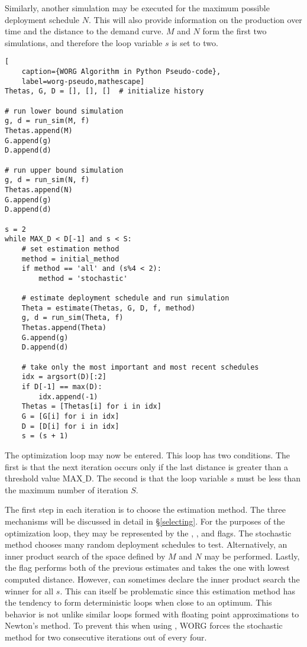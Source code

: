 Similarly, another simulation may be executed for the maximum possible
deployment schedule $N$. This will also provide information on the 
production over time and the distance to the demand curve. $M$ and $N$
form the first two simulations, and therefore the loop 
variable $s$ is set to two.

\clearpage
\begin{lstlisting}[
    caption={WORG Algorithm in Python Pseudo-code},
    label=worg-pseudo,mathescape]
Thetas, G, D = [], [], []  # initialize history

# run lower bound simulation
g, d = run_sim(M, f)
Thetas.append(M)
G.append(g)
D.append(d)

# run upper bound simulation    
g, d = run_sim(N, f)
Thetas.append(N)
G.append(g)
D.append(d)

s = 2
while MAX_D < D[-1] and s < S:
    # set estimation method
    method = initial_method
    if method == 'all' and (s%4 < 2):
        method = 'stochastic'

    # estimate deployment schedule and run simulation
    Theta = estimate(Thetas, G, D, f, method)
    g, d = run_sim(Theta, f)
    Thetas.append(Theta)
    G.append(g)
    D.append(d)

    # take only the most important and most recent schedules
    idx = argsort(D)[:2]
    if D[-1] == max(D):
        idx.append(-1)
    Thetas = [Thetas[i] for i in idx]
    G = [G[i] for i in idx]
    D = [D[i] for i in idx]
    s = (s + 1)
\end{lstlisting}
\clearpage

The optimization loop may now be entered.  This loop has two conditions.
The first is that the next iteration occurs only if the last distance
is greater than a threshold value $\mathrm{MAX\_D}$. The second is that 
the loop variable $s$ must be less than the maximum number
of iteration $S$.

The first step in each iteration is to choose the estimation method. The
three mechanisms will be discussed in detail in \S\ref{selecting}. For
the purposes of the optimization loop, they may be represented by the 
\stochastic, \innerprod, and \allflag flags. The stochastic method 
chooses many random deployment schedules to test. Alternatively, an inner
product search of the space defined by $M$ and $N$ may be performed. 
Lastly, the \allflag flag performs both of the previous estimates and takes
the one with lowest computed distance.  However, \allflag can sometimes
declare the inner product search the winner for all $s$.  This can itself 
be problematic since this estimation method has the tendency to form 
deterministic loops when close to an optimum. This behavior is not unlike
similar loops formed with floating point approximations to Newton's method.
To prevent this when using \allflag, WORG forces the stochastic method
for two consecutive iterations out of every four.  
 

